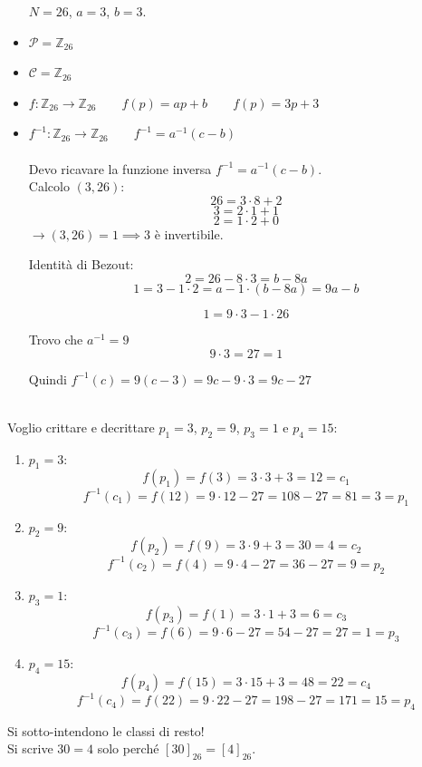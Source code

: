 \documentclass[a4paper,12pt, oneside]{book}
\begin{document}
\begin{shaded}
	\begin{esempio}
		\begin{itemize} $N = 26$, $a=3$, $b=3$.
			\item $\mathcal{P} = \mathbb{Z}_{26}$
			\item $\mathcal{C} = \mathbb{Z}_{26}$
			\item $f: \mathbb{Z}_{26} \rightarrow \mathbb{Z}_{26} \qquad f(p) = ap+b \qquad f(p) = 3p+3$
			\item $f^{-1}: \mathbb{Z}_{26} \rightarrow \mathbb{Z}_{26} \qquad f^{-1} = a^{-1} (c-b)$\\\\
			      Devo ricavare la funzione inversa $f^{-1} = a^{-1} (c-b)$.\\
			      Calcolo $(3, 26)$:
			      $$26 = 3 \cdot 8 + 2$$
			      $$3 = 2 \cdot 1 + 1$$
			      $$2 = 1 \cdot 2 + 0$$
			      $\rightarrow (3, 26) = 1 \implies 3$ è invertibile.

			      Identità di Bezout:
			      $$2 = 26 - 8 \cdot 3 = b - 8a$$
			      $$1 = 3  - 1 \cdot 2 = a - 1 \cdot (b-8a) = 9a-b$$

			      $$1 = 9 \cdot 3 - 1 \cdot 26$$

			      Trovo che $a^{-1} = 9$
			      $$9 \cdot 3 = 27 = 1$$

			      Quindi $f^{-1}(c) = 9 (c-3) = 9c -9 \cdot 3 = 9c -27$\\\\
		\end{itemize}

		Voglio crittare e decrittare $p_1=3$, $p_2=9$, $p_3=1$ e $p_4=15$:
		\begin{enumerate}
			\item $p_1 = 3$:\\
			      $$f(p_1) = f(3) = 3 \cdot 3 + 3 = 12 = c_1$$
			      $$f^{-1}(c_1) = f(12) = 9 \cdot 12 - 27 = 108 - 27 = 81 = 3 = p_1$$
			\item $p_2 = 9$:\\
			      $$f(p_2) = f(9) = 3 \cdot 9 + 3 = 30 = 4 = c_2$$
			      $$f^{-1}(c_2) = f(4) = 9 \cdot 4 - 27 = 36 - 27 = 9 = p_2$$
			\item $p_3 = 1$:\\
			      $$f(p_3) = f(1) = 3 \cdot 1 + 3 = 6 = c_3$$
			      $$f^{-1}(c_3) = f(6) = 9 \cdot 6 - 27 = 54 - 27 = 27 = 1 = p_3$$
			\item $p_4 = 15$:\\
			      $$f(p_4) = f(15) = 3 \cdot 15 + 3 = 48 = 22 = c_4$$
			      $$f^{-1}(c_4) = f(22) = 9 \cdot 22 - 27 = 198 - 27 = 171 = 15 = p_4$$
		\end{enumerate}

		\begin{nota}
			Si sotto-intendono le classi di resto!\\
			Si scrive $30 = 4$ solo perché $[30]_{26} = [4]_{26}$.
		\end{nota}

	\end{esempio}
\end{shaded}
\end{document}
